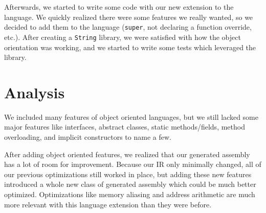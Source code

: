 \documentclass{article}
\begin{document}
Afterwards, we started to write some code with our new extension to the
language. We quickly realized there were some features we really wanted, so we
decided to add them to the language (\texttt{super}, not declaring a function
override, etc.). After creating a \texttt{String} library, we were satisfied
with how the object orientation was working, and we started to write some tests
which leveraged the library.

\section{Analysis}

We included many features of object oriented languages, but we still lacked some
major features like interfaces, abstract classes, static methods/fields, method
overloading, and implicit constructors to name a few.

After adding object oriented features, we realized that our generated assembly
has a lot of room for improvement. Because our IR only minimally changed, all of
our previous optimizations still worked in place, but adding these new features
introduced a whole new class of generated assembly which could be much better
optimized. Optimizations like memory aliasing and address arithmetic are much
more relevant with this language extension than they were before.
\end{document}
